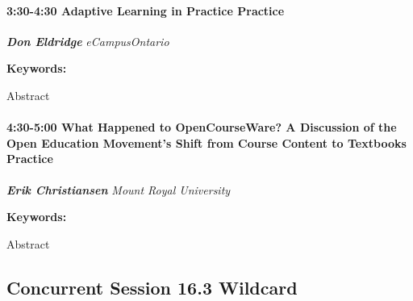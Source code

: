 \documentclass[
]{book}
\begin{document}
\begin{session}
\hypertarget{adaptive-learning-in-practice-practice}{%
\paragraph*{\texorpdfstring{3:30-4:30 \textbar{} \textbf{Adaptive
Learning in Practice} \textbar{}
Practice}{3:30-4:30 \textbar{} Adaptive Learning in Practice \textbar{} Practice}}\label{adaptive-learning-in-practice-practice}}

\textbf{\emph{Don Eldridge}} \textbar{} \emph{eCampusOntario}

\textbf{Keywords:}

Abstract
\end{session}
\begin{session}
\hypertarget{what-happened-to-opencourseware-a-discussion-of-the-open-education-movements-shift-from-course-content-to-textbooks-practice}{%
\paragraph*{\texorpdfstring{4:30-5:00 \textbar{} \textbf{What Happened
to OpenCourseWare? A Discussion of the Open Education Movement's Shift
from Course Content to Textbooks} \textbar{}
Practice}{4:30-5:00 \textbar{} What Happened to OpenCourseWare? A Discussion of the Open Education Movement's Shift from Course Content to Textbooks \textbar{} Practice}}\label{what-happened-to-opencourseware-a-discussion-of-the-open-education-movements-shift-from-course-content-to-textbooks-practice}}

\textbf{\emph{Erik Christiansen}} \textbar{} \emph{Mount Royal
University}

\textbf{Keywords:}

Abstract
\end{session}

\hypertarget{concurrent-session-16.3-wildcard}{%
\subsection*{Concurrent Session 16.3 \textbar{} Wildcard}\label{concurrent-session-16.3-wildcard}}
\end{document}
